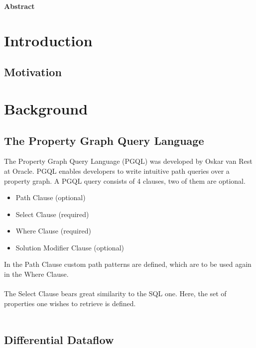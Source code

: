 \documentclass[11pt,singlecolumn]{scrartcl}
\begin{document}
\hspace{60mm}
\begin{center}
 \textbf{Abstract} \end{center}



\clearpage
\tableofcontents
\clearpage
\section{Introduction}
\subsection{Motivation}

\clearpage

\section{Background}
\subsection{The Property Graph Query Language}

The Property Graph Query Language (PGQL) was developed by Oskar van Rest at Oracle. \cite{vanRest:2016} PGQL enables developers to write intuitive path queries over a property graph. A PGQL query consists of 4 clauses, two of them are optional.
\begin{itemize} 
\item Path Clause (optional)
\item Select Clause (required)
\item Where Clause (required)
\item Solution Modifier Clause (optional)
\end{itemize}

In the Path Clause custom path patterns are defined, which are to be used again in the Where Clause.\\\\
The Select Clause bears great similarity to the SQL one. Here, the set of properties one wishes to retrieve is defined.\\\\
 

\clearpage

\subsection{Differential Dataflow}
\end{document}
